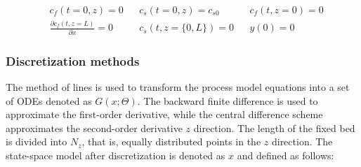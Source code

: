\documentclass[a4paper,fleqn]{cas-dc}
\begin{document}
			{\footnotesize
				\begin{align*}
					&c_f(t = 0, z) = 0 && c_s(t = 0, z) = c_{s0} && {c_f}(t, z=0) = 0 \\
					&\frac{\partial c_f(t,z=L)}{\partial x} = 0 && c_s(t, z=\{0,L\}) = 0 && y(0) = 0
			\end{align*} }
			
			\subsubsection{Discretization methods}
			
			The method of lines is used to transform the process model equations into a set of ODEs denoted as $G(x;\Theta)$. The backward finite difference is used to approximate the first-order derivative, while the central difference scheme approximates the second-order derivative $z$ direction. The length of the fixed bed is divided into $N_z$, that is, equally distributed points in the $z$ direction. The state-space model after discretization is denoted as $x$ and defined as follows:
			
\end{document}
